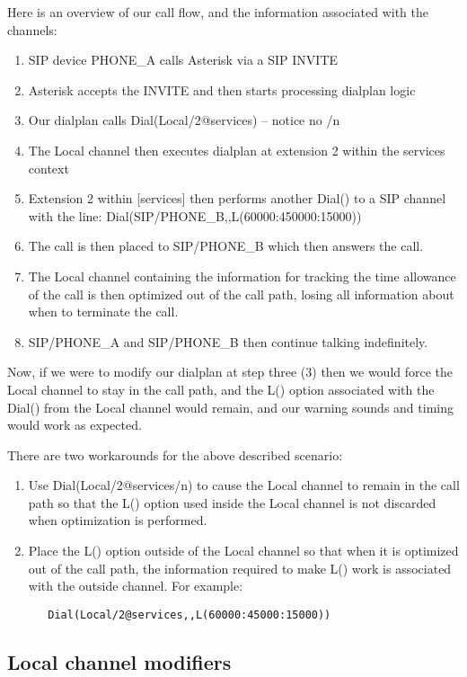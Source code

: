 Here is an overview of our call flow, and the information associated with the
channels:

\begin{enumerate}
  \item SIP device PHONE\_A calls Asterisk via a SIP INVITE
  \item Asterisk accepts the INVITE and then starts processing dialplan logic
  \item Our dialplan calls Dial(Local/2@services) -- notice no /n
  \item The Local channel then executes dialplan at extension 2 within the services context
  \item Extension 2 within [services] then performs another Dial() to a SIP channel with the line:  Dial(SIP/PHONE\_B,,L(60000:450000:15000))
  \item The call is then placed to SIP/PHONE\_B which then answers the call.
  \item The Local channel containing the information for tracking the time allowance of the call is then optimized out of the call path, losing all information about when to terminate the call.
  \item SIP/PHONE\_A and SIP/PHONE\_B then continue talking indefinitely.  
\end{enumerate}

Now, if we were to modify our dialplan at step three (3) then we would force the
Local channel to stay in the call path, and the L() option associated with the
Dial() from the Local channel would remain, and our warning sounds and timing
would work as expected.

There are two workarounds for the above described scenario:

\begin{enumerate}
\item Use Dial(Local/2@services/n) to cause the Local channel to remain in the call
path so that the L() option used inside the Local channel is not discarded
when optimization is performed.
\item Place the L() option outside of the Local channel so that when it is
optimized out of the call path, the information required to make L() work is
associated with the outside channel. For example: 
\begin{verbatim}
   Dial(Local/2@services,,L(60000:45000:15000))
\end{verbatim}
\end{enumerate}

\subsection{Local channel modifiers}

